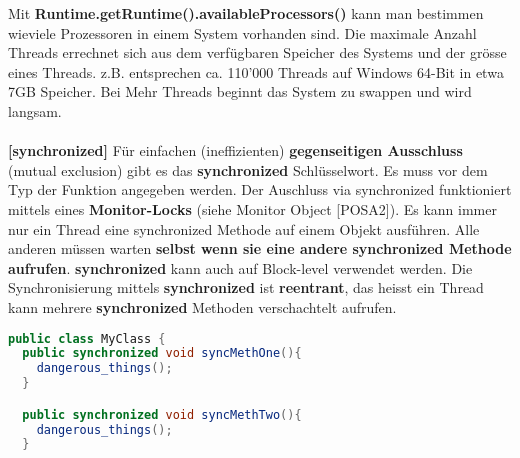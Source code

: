\documentclass[8pt]{extarticle}
\let\oldtextbf\textbf
\renewcommand{\textbf}{\tiny\oldtextbf}
\begin{document}
\begin{multicols*}{5}
Mit \textbf{Runtime.getRuntime().availableProcessors()} kann man bestimmen wieviele Prozessoren in einem System vorhanden sind. Die maximale Anzahl Threads errechnet sich aus dem verfügbaren Speicher des Systems und der grösse eines Threads. z.B. entsprechen ca. 110'000 Threads auf Windows 64-Bit in etwa 7GB Speicher. Bei Mehr Threads beginnt das System zu swappen und wird langsam.\\\\
\textbf{[synchronized]} Für einfachen (ineffizienten) \textbf{gegenseitigen Ausschluss} (mutual exclusion) gibt es das \textbf{synchronized} Schlüsselwort. Es muss vor dem Typ der Funktion angegeben werden. Der Auschluss via synchronized funktioniert mittels eines \textbf{Monitor-Locks} (siehe Monitor Object [POSA2]). Es kann immer nur ein Thread eine synchronized Methode auf einem Objekt ausführen. Alle anderen müssen warten \textbf{selbst wenn sie eine andere synchronized Methode aufrufen}. \textbf{synchronized} kann auch auf Block-level verwendet werden. Die Synchronisierung mittels \textbf{synchronized} ist \textbf{reentrant}, das heisst ein Thread kann mehrere \textbf{synchronized} Methoden verschachtelt aufrufen.
\begin{lstlisting}[language=java]
public class MyClass {
  public synchronized void syncMethOne(){
    dangerous_things();
  }

  public synchronized void syncMethTwo(){
    dangerous_things();
  }


\end{lstlisting}
\end{multicols*}
\end{document}
